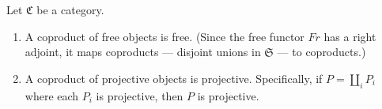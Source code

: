 Let $\mathfrak{C}$ be a category.
\begin{enumerate}
\item[(i)] A coproduct of free objects is free. (Since the free functor $Fr$ has a right adjoint, it maps coproducts — disjoint unions in $\mathfrak{S}$ — to coproducts.)
\item[(ii)] A coproduct of projective objects is projective. Specifically, if $P = \coprod_i P_i$ where each $P_i$ is projective, then $P$ is projective.
\end{enumerate}
